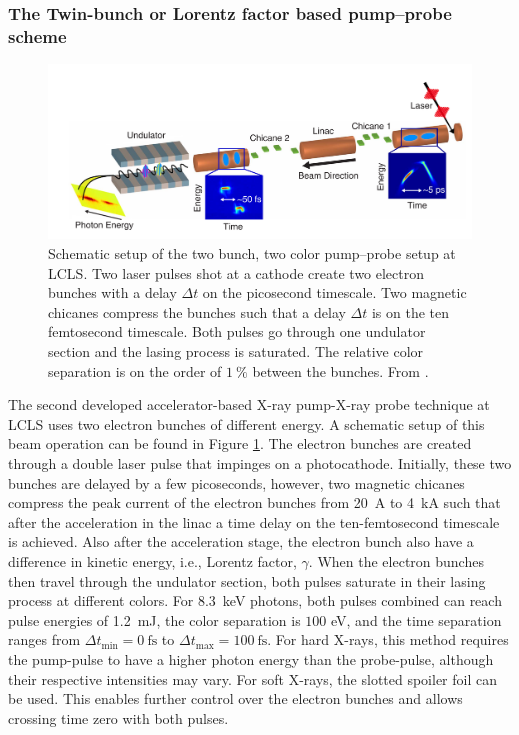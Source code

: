 \subsubsection{The Twin-bunch or Lorentz factor based pump--probe scheme}
\begin{figure}
	\centering
		\includegraphics[width=1.00\textwidth]{images/Agos-pump-probe-scheme.png}
	\caption[Schematic setup of a bunch based pump-probe setup.]{Schematic setup of the two bunch, two color pump--probe setup at LCLS. Two laser pulses shot at a cathode create two electron bunches with a delay $\Delta t$ on the picosecond timescale. Two magnetic chicanes compress the bunches such that a delay $\Delta t$ is on the ten femtosecond timescale. Both pulses go through one undulator section and the lasing process is saturated. The relative color separation is on the order of $\SI{1}{\percent}$ between the bunches. From \citep[\href{http://creativecommons.org/licenses/by/4.0/}{\ccby}]{Marinelli-2015-NatComm}.}
	\label{fig:Agos-pump-probe-scheme}
\end{figure}
The second developed accelerator-based X-ray pump-X-ray probe technique at LCLS \citep{Marinelli-2015-NatComm} uses two electron bunches of different energy. A schematic setup of this beam operation can be found in Figure \ref{fig:Agos-pump-probe-scheme}. The electron bunches are created through a double laser pulse that impinges on a photocathode. Initially, these two bunches are delayed by a few picoseconds, however, two magnetic chicanes compress the peak current of the electron bunches from \SI{20}{\ampere} to \SI{4}{\kilo\ampere} such that after the acceleration in the linac a time delay on the ten-femtosecond timescale is achieved. Also after the acceleration stage, the electron bunch also have a difference in kinetic energy, i.e., Lorentz factor, $\gamma$. When the electron bunches then travel through the undulator section, both pulses saturate in their lasing process at different colors. For \SI{8.3}{\kilo\electronvolt} photons, both pulses combined can reach pulse energies of \SI{1.2}{\milli\joule}, the color separation is $100$ eV, and the time separation ranges from $\Delta t_{\text{min}}=\SI{0}{\femto\second}$ to $\Delta t_{\text{max}}=\SI{100}{\femto\second}$. For hard X-rays, this method requires the pump-pulse to have a higher photon energy than the probe-pulse, although their respective intensities may vary. For soft X-rays, the slotted spoiler foil can be used. This enables further control over the electron bunches and allows crossing time zero with both pulses.
